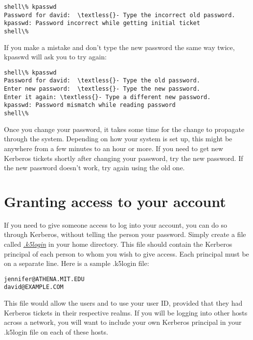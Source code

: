 \documentclass[letterpaper,10pt,english]{sphinxmanual}
\begin{document}
\begin{Verbatim}[commandchars=\\\{\}]
shell\% kpasswd
Password for david:  \textless{}- Type the incorrect old password.
kpasswd: Password incorrect while getting initial ticket
shell\%
\end{Verbatim}

If you make a mistake and don't type the new password the same way
twice, kpasswd will ask you to try again:

\begin{Verbatim}[commandchars=\\\{\}]
shell\% kpasswd
Password for david:  \textless{}- Type the old password.
Enter new password:  \textless{}- Type the new password.
Enter it again: \textless{}- Type a different new password.
kpasswd: Password mismatch while reading password
shell\%
\end{Verbatim}

Once you change your password, it takes some time for the change to
propagate through the system.  Depending on how your system is set up,
this might be anywhere from a few minutes to an hour or more.  If you
need to get new Kerberos tickets shortly after changing your password,
try the new password.  If the new password doesn't work, try again
using the old one.


\section{Granting access to your account}
\label{user/pwd_mgmt:grant-access}\label{user/pwd_mgmt:granting-access-to-your-account}
If you need to give someone access to log into your account, you can
do so through Kerberos, without telling the person your password.
Simply create a file called {\hyperref[user/user_config/k5login:k5login-5]{\emph{.k5login}}} in your home directory.
This file should contain the Kerberos principal of each person to whom
you wish to give access.  Each principal must be on a separate line.
Here is a sample .k5login file:

\begin{Verbatim}[commandchars=\\\{\}]
jennifer@ATHENA.MIT.EDU
david@EXAMPLE.COM
\end{Verbatim}

This file would allow the users  and  to use your
user ID, provided that they had Kerberos tickets in their respective
realms.  If you will be logging into other hosts across a network, you
will want to include your own Kerberos principal in your .k5login file
on each of these hosts.
\end{document}
